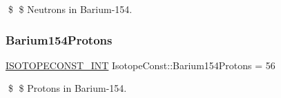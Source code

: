 \$ \$ Neutrons in Barium-\/154. \mbox{\label{group___isotope_const-_barium-_ba154_gaf2b1119a2ebf016da7472475ec15b243}} 
\subsubsection{\texorpdfstring{Barium154\+Protons}{Barium154Protons}}
{\footnotesize\ttfamily \mbox{\hyperlink{group___isotope_const-_macros_ga5f18360b3e99483a35c32d789e62621c}{I\+S\+O\+T\+O\+P\+E\+C\+O\+N\+S\+T\+\_\+\+I\+NT}} Isotope\+Const\+::\+Barium154\+Protons = 56}

\$ \$ Protons in Barium-\/154. 